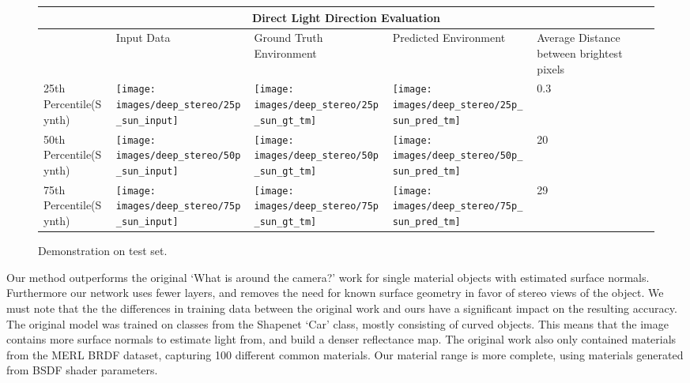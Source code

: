 \documentclass[ %
                    author={Gavin Parker},
                supervisor={Dr. Neill Campbell},
                    degree={MEng},
                     title={Deep Learning for Illumination Estimation from Stereo Images},
                  subtitle={},
                      type={Research},
                      year={2018} ]{dissertation}
\begin{document}
 \begin{figure}[H]
\centering
\begin{tabular}{ |p{3cm}||p{3cm}|p{3cm}|p{3cm}|p{3cm}|  }
 \hline
 \multicolumn{5}{|c|}{Direct Light Direction Evaluation} \\
 \hline
  & Input Data &Ground Truth Environment&Predicted Environment&Average Distance between brightest pixels\\
 \hline
 25th Percentile(Synth)&\parbox[c]{1em}{
 \texttt{[image: images/deep\_stereo/25p\_sun\_input]}}&\parbox[c]{1em}{\texttt{[image: images/deep\_stereo/25p\_sun\_gt\_tm]}}&
\parbox[c]{1em}{\texttt{[image: images/deep\_stereo/25p\_sun\_pred\_tm]}}& 0.3\\
 50th Percentile(Synth)&\parbox[c]{1em}{
 \texttt{[image: images/deep\_stereo/50p\_sun\_input]}}&\parbox[c]{1em}{\texttt{[image: images/deep\_stereo/50p\_sun\_gt\_tm]}}&
\parbox[c]{1em}{\texttt{[image: images/deep\_stereo/50p\_sun\_pred\_tm]}}& 20\\
 75th Percentile(Synth)&\parbox[c]{1em}{
 \texttt{[image: images/deep\_stereo/75p\_sun\_input]}}&\parbox[c]{1em}{\texttt{[image: images/deep\_stereo/75p\_sun\_gt\_tm]}}&
\parbox[c]{1em}{\texttt{[image: images/deep\_stereo/75p\_sun\_pred\_tm]}}& 29\\
 \hline
\end{tabular}

\caption{Demonstration on test set.}
\label{tab:sun_results}

\end{figure}
Our method outperforms the original `What is around the camera?' work for single material objects with estimated surface normals. Furthermore our network uses fewer layers, and removes the need for known surface geometry in favor of stereo views of the object. We must note that the the differences in training data between the original work and ours have a significant impact on the resulting accuracy. The original model was trained on classes from the Shapenet `Car' class, mostly consisting of curved objects. This means that the image contains more surface normals to estimate light from, and build a denser reflectance map. The original work also only contained materials from the MERL BRDF dataset, capturing 100 different common materials. Our material range is more complete, using materials generated from BSDF shader parameters.
\end{document}
